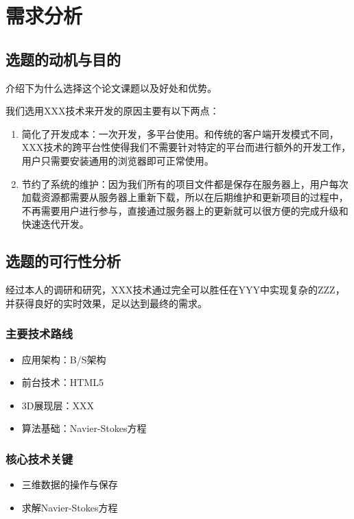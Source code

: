 \chapter{需求分析}
\section{选题的动机与目的}

介绍下为什么选择这个论文课题以及好处和优势。

我们选用XXX技术来开发的原因主要有以下两点：

\begin{enumerate}
\item 简化了开发成本：一次开发，多平台使用。和传统的客户端开发模式不同，XXX技术的跨平台性使得我们不需要针对特定的平台而进行额外的开发工作，用户只需要安装通用的浏览器即可正常使用。
\item 节约了系统的维护：因为我们所有的项目文件都是保存在服务器上，用户每次加载资源都需要从服务器上重新下载，所以在后期维护和更新项目的过程中，不再需要用户进行参与，直接通过服务器上的更新就可以很方便的完成升级和快速迭代开发。
\end{enumerate}

\section{选题的可行性分析}

经过本人的调研和研究，XXX技术通过完全可以胜任在YYY中实现复杂的ZZZ，并获得良好的实时效果，足以达到最终的需求。

\subsection{主要技术路线}
\begin{itemize}
  \item 应用架构：B/S架构
  \item 前台技术：HTML5
  \item 3D展现层：XXX
  \item 算法基础：Navier-Stokes方程
\end{itemize}

\subsection{核心技术关键}
\begin{itemize}
  \item 三维数据的操作与保存
  \item 求解Navier-Stokes方程
\end{itemize}

